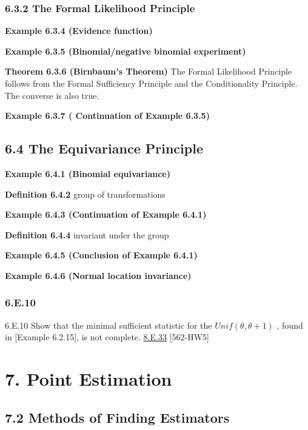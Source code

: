 \documentclass[10pt,twocolumn,portrait]{article}
\begin{document}
\hypertarget{the-formal-likelihood-principle}{%
\subsubsection{6.3.2 The Formal Likelihood
Principle}\label{the-formal-likelihood-principle}}

\textbf{Example 6.3.4 (Evidence function)}

\textbf{Example 6.3.5 (Binomial/negative binomial experiment)}

\textbf{Theorem 6.3.6 (Birnbaum's Theorem)} The Formal Likelihood
Principle follows from the Formal Sufficiency Principle and the
Conditionality Principle. The converse is also true.

\textbf{Example 6.3.7 ( Continuation of Example 6.3.5)}

\hypertarget{the-equivariance-principle}{%
\subsection{6.4 The Equivariance
Principle}\label{the-equivariance-principle}}

\textbf{Example 6.4.1 (Binomial equivariance)}

\textbf{Definition 6.4.2} group of transformations

\textbf{Example 6.4.3 (Continuation of Example 6.4.1)}

\textbf{Definition 6.4.4} invariant under the group

\textbf{Example 6.4.5 (Conclusion of Example 6.4.1)}

\textbf{Example 6.4.6 (Normal location invariance)}

\hypertarget{e.10}{%
\subsubsection{6.E.10}\label{e.10}}

6.E.10 Show that the minimal sufficient statistic for the
\(Unif(\theta,\theta+1)\) , found in {[}Example 6.2.15{]}, is not
complete. \protect\hyperlink{e.33}{8.E.33} {[}562-HW5{]}

\hypertarget{point-estimation}{%
\section{7. Point Estimation}\label{point-estimation}}

\hypertarget{methods-of-finding-estimators}{%
\subsection{7.2 Methods of Finding
Estimators}\label{methods-of-finding-estimators}}
\end{document}

